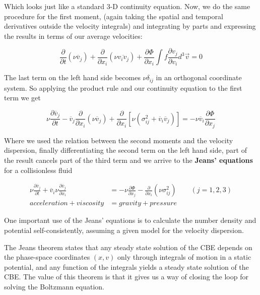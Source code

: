 Which looks just like a standard 3-D continuity equation. Now, we do the same procedure for the first moment, (again taking the spatial and temporal derivatives outside the velocity integrals) and integrating by parts and expressing the results in terms of our average velocities:

\begin{equation}
\frac{\partial}{\partial t}(\nu \overline{v}_{j})+\frac{\partial}{\partial x_{i}}(\nu \overline{v_{i}v_{j}})+\frac{\partial \Phi}{\partial x_{i}}\int f\frac{\partial v_{j}}{\partial v_{i}}d^{3}\vec{v}=0
\end{equation} 

The last term on the left hand side becomes $\nu \delta_{ij}$ in an orthogonal coordinate system. So applying the product rule and our continuity equation to the first term we get

\begin{equation}
\nu \frac{\partial \overline{v}_{j}}{\partial t}-\overline{v}_{j}\frac{\partial}{\partial x_{i}}(\nu \overline{v}_{j})+\frac{\partial}{\partial x_{i}}[\nu(\sigma_{ij}^{2}+\overline{v}_{i}\overline{v}_{j})]=-\nu \overline{v}_{i}\frac{\partial \Phi}{\partial x_{j}}
\end{equation}

Where we used the relation between the second moments and the velocity dispersion, finally differentiating the second term on the left hand side, part of the result cancels part of the third term and we arrive to the \textbf{Jeans' equations} for a collisionless fluid

\begin{equation}
\begin{aligned}	
	\nu \frac{\partial \overline{v}_j}{\partial t} + \overline{v}_i\nu \frac{\partial\overline{v}_j}{\partial x_{i}} &= -\nu \frac{\partial\Phi}{\partial x_{j}}-\frac{\partial}{\partial x_{i}}(\nu \sigma_{ij}^{2})\quad\quad (j=1,2,3) \\     acceleration + viscosity &= gravity + pressure
	\end{aligned}
\end{equation}

One important use of the Jeans' equations is to calculate the number density and potential self-consistently, assuming
a given model for the velocity dispersion.

The Jeans theorem states that any steady state solution of the CBE depends on the phase-space coordinates $(x,v)$ only through integrals of motion in a static potential, and any function of the integrals yields a steady state solution of the CBE. The value of this theorem is that it gives us a way of closing the loop for solving the Boltzmann equation. 

